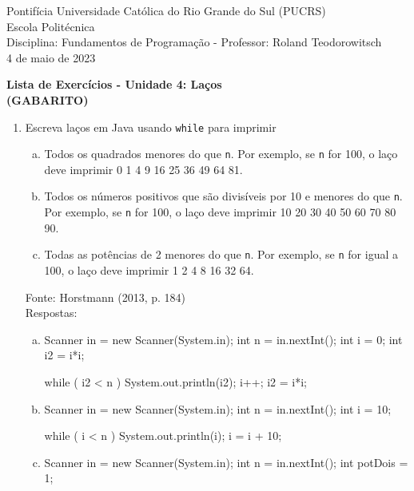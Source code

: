 \documentclass[onecolumn,a4paper,10pt]{report}
\newcommand{\+}{\, + \,}
\newcommand{\<}{\hspace*{-0.4cm}}
\begin{document}
\singlespacing

\begin{center}
Pontifícia Universidade Católica do Rio Grande do Sul (PUCRS)\\
Escola Politécnica\\
Disciplina: Fundamentos de Programação - Professor: Roland Teodorowitsch\\
4 de maio de 2023
\end{center}

\begin{center}
\textbf{Lista de Exercícios - Unidade 4: Laços\\(GABARITO)}
\end{center}

\begin{enumerate}[1.]

\item Escreva laços em Java usando \texttt{while} para imprimir
\begin{enumerate}[a)]
	\item Todos os quadrados menores do que \texttt{n}. Por exemplo, se \texttt{n} for 100, o laço deve imprimir 0 1 4 9 16 25 36 49 64 81.
	\item Todos os números positivos que são divisíveis por 10 e menores do que \texttt{n}. Por exemplo, se \texttt{n} for 100, o laço deve imprimir 10 20 30 40 50 60 70 80 90.
	\item Todas as potências de 2 menores do que \texttt{n}. Por exemplo, se \texttt{n} for igual a 100, o laço deve imprimir 1 2 4 8 16 32 64.
\end{enumerate}
{\tiny Fonte: Horstmann (2013, p. 184)}\\
Respostas:
\begin{enumerate}[a)]
	\item
\begin{javacode}
Scanner in = new Scanner(System.in);
int n = in.nextInt();
int i = 0;
int i2 = i*i;

while ( i2 < n ) {
   System.out.println(i2);
   i++;
   i2 = i*i;
}
\end{javacode}
	\item
\begin{javacode}
Scanner in = new Scanner(System.in);
int n = in.nextInt();
int i = 10;

while ( i < n ) {
   System.out.println(i);
   i = i + 10;
}
\end{javacode}
	\item
\begin{javacode}
Scanner in = new Scanner(System.in);
int n = in.nextInt();
int potDois = 1;


\end{javacode}
\end{enumerate}
\end{enumerate}
\end{document}
